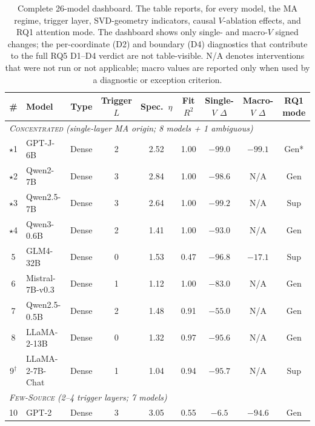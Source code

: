 \documentclass{article}
\begin{document}
\begin{table}[t]
  \caption{Complete 26-model dashboard. The table reports, for every model,
  the MA regime, trigger layer, SVD-geometry indicators, causal $V$-ablation
  effects, and RQ1 attention mode. The dashboard shows only single- and
  macro-$V$ signed changes; the per-coordinate (D2) and boundary (D4)
  diagnostics that contribute to the full RQ5 D1--D4 verdict are not
  table-visible. N/A denotes interventions that were not run or not
  applicable; macro values are reported only when used by a diagnostic or
  exception criterion.}
  \label{tab:master}
  \centering
  \begingroup
  \scriptsize
  \setlength{\tabcolsep}{2.4pt}
  \renewcommand{\arraystretch}{0.82}
  \begin{tabular*}{\textwidth}{@{\extracolsep{\fill}}clccccccc@{}}
    \toprule
    \# & Model & Type & Trigger $L$ & Spec.\ $\eta$ & Fit $R^2$ &
    Single-$V$ $\Delta$ & Macro-$V$ $\Delta$ & RQ1 mode \\
    \midrule
    \multicolumn{9}{l}{\textit{\textsc{Concentrated} (single-layer MA origin; 8 models + 1 ambiguous)}} \\
    \midrule
    $\star$1  & GPT-J-6B             & Dense & 2  & 2.52 & 1.00 & $-99.0$ & $-99.1$ & Gen* \\
    $\star$2  & Qwen2-7B             & Dense & 3  & 2.84 & 1.00 & $-98.6$ & N/A     & Gen  \\
    $\star$3  & Qwen2.5-7B           & Dense & 3  & 2.64 & 1.00 & $-99.2$ & N/A     & Sup  \\
    $\star$4  & Qwen3-0.6B           & Dense & 2  & 1.41 & 1.00 & $-93.0$ & N/A     & Gen  \\
    5         & GLM4-32B             & Dense & 0  & 1.53 & 0.47 & $-96.8$ & $-17.1$ & Sup  \\
    6         & Mistral-7B-v0.3      & Dense & 1  & 1.12 & 1.00 & $-83.0$ & N/A     & Gen  \\
    7         & Qwen2.5-0.5B         & Dense & 2  & 1.48 & 0.91 & $-55.0$ & N/A     & Gen  \\
    8         & LLaMA-2-13B          & Dense & 0  & 1.32 & 0.97 & $-95.6$ & N/A     & Gen  \\
    9$^{\dagger}$ & LLaMA-2-7B-Chat  & Dense & 1  & 1.04 & 0.94 & $-95.7$ & N/A     & Sup  \\
    \midrule
    \multicolumn{9}{l}{\textit{\textsc{Few-Source} (2--4 trigger layers; 7 models)}} \\
    \midrule
    10  & GPT-2                      & Dense & 3  & 3.05 & 0.55 & $-6.5$  & $-94.6$  & Gen  \\

\end{tabular*}
\end{table}
\end{document}

